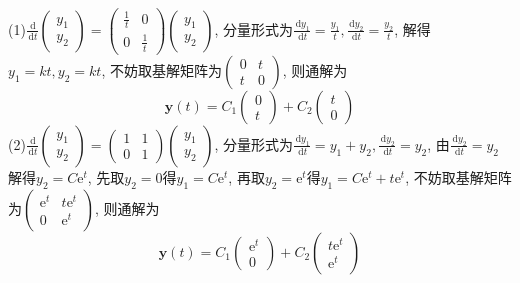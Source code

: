 \documentclass[titlepage,11pt,a4paper,twoside]{report}
\makeatletter
\newcommand\diff{\,\mathrm{d}}
\newcommand\e{\mathrm{e}}
\newenvironment{solve}{\par
	\pushQED{\qed}%
	\normalfont \topsep1\p@\@plus6\p@\relax
	\trivlist
	\item\relax
	{\hspace*{\parindent}{\heiti 解}\@addpunct{:}}\hspace\labelsep\ignorespaces
}{%
	\popQED\endtrivlist\@endpefalse
}
\makeatother
\begin{document}
\begin{solve}
(1)$\displaystyle\frac{\diff}{\diff t}\begin{pmatrix}y_1\\y_2\end{pmatrix}=\begin{pmatrix}\frac{1}{t}&0\\0&\frac{1}{t}\end{pmatrix}\begin{pmatrix}y_1\\y_2\end{pmatrix}$, 分量形式为$\displaystyle\frac{\diff y_1}{\diff t}=\frac{y_1}{t},\frac{\diff y_2}{\diff t}=\frac{y_2}{t}$, 解得$y_1=kt,y_2=kt$, 不妨取基解矩阵为$\begin{pmatrix}0&t\\t&0\end{pmatrix}$, 则通解为
\[\bm{y}(t)=C_1\begin{pmatrix}0\\t\end{pmatrix}+C_2\begin{pmatrix}t\\0\end{pmatrix}\]
(2)$\displaystyle\frac{\diff}{\diff t}\begin{pmatrix}y_1\\y_2\end{pmatrix}=\begin{pmatrix}1&1\\0&1\end{pmatrix}\begin{pmatrix}y_1\\y_2\end{pmatrix}$, 分量形式为$\displaystyle\frac{\diff y_1}{\diff t}=y_1+y_2,\frac{\diff y_2}{\diff t}=y_2$, 由$\displaystyle\frac{\diff y_2}{\diff t}=y_2$解得$y_2=C\e^t$, 先取$y_2=0$得$y_1=C\e^t$, 再取$y_2=\e^t$得$y_1=C\e^t+t\e^t$, 不妨取基解矩阵为$\begin{pmatrix}\e^t&t\e^t\\0&\e^t\end{pmatrix}$, 则通解为
\[\bm{y}(t)=C_1\begin{pmatrix}\e^t\\0\end{pmatrix}+C_2\begin{pmatrix}t\e^t\\\e^t\end{pmatrix}\]

\end{solve}
\end{document}
